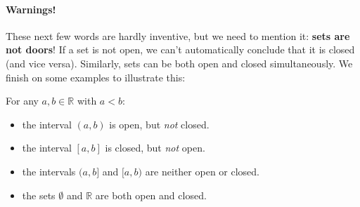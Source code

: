 \documentclass[
  12pt,
  a4paper]{extarticle}
\providecommand{\tightlist}{%
  \setlength{\itemsep}{0pt}\setlength{\parskip}{0pt}}
\theoremstyle{plain}
\theoremstyle{plain}
\theoremstyle{plain}
\theoremstyle{plain}
\theoremstyle{plain}
\theoremstyle{definition}
\theoremstyle{definition}
\theoremstyle{definition}
\theoremstyle{remark}
\renewcommand{\;}{\,}
\begin{document}
\hypertarget{warnings}{%
\paragraph*{Warnings!}\label{warnings}}

These next few words are hardly inventive, but we need to mention it: \textbf{sets are not doors}! If a set is not open, we can't automatically conclude that it is closed (and vice versa). Similarly, sets can be both open and closed simultaneously. We finish on some examples to illustrate this:

For any \(a,b \in \mathbb{R}\) with \(a < b\):

\begin{itemize}
\tightlist
\item
  the interval \((a,b)\) is open, but \emph{not} closed.
\item
  the interval \([a,b]\) is closed, but \emph{not} open.
\item
  the intervals \((a,b]\) and \([a,b)\) are neither open or closed.
\item
  the sets \(\emptyset\) and \(\mathbb{R}\) are both open and closed.
\end{itemize}
\end{document}
